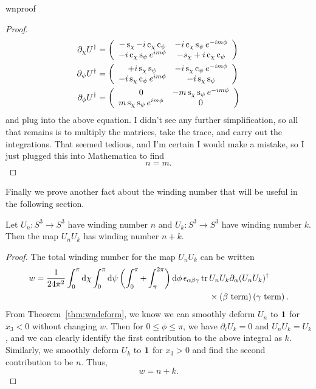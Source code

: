 \begin{proposition}{}{wnproof}
\begin{proof}
\begin{equation*}
\begin{aligned}
    \partial_\chi U^\dagger
             &=\left(\begin{array}{cc}
                  -\operatorname{s}_\chi-i\operatorname{c}_\chi\operatorname{c}_\psi  & -i\operatorname{c}_\chi\operatorname{s}_\psi e^{-im\phi}\\
                 -i\operatorname{c}_\chi\operatorname{s}_\psi e^{im\phi} & -s_\chi+i\operatorname{c}_\chi\operatorname{c}_\psi 
                \end{array}\right)\\
    \partial_\psi U^\dagger
             &=\left(\begin{array}{cc}
                  +i\operatorname{s}_\chi\operatorname{s}_\psi & -i\operatorname{s}_\chi\operatorname{c}_\psi e^{-im\phi}\\
                 -i\operatorname{s}_\chi\operatorname{c}_\psi e^{im\phi} & -i\operatorname{s}_\chi\operatorname{s}_\psi 
                \end{array}\right)\\
    \partial_\phi U^\dagger
             &=\left(\begin{array}{cc}
                  0 & -m\operatorname{s}_\chi\operatorname{s}_\psi e^{-im\phi}\\
                 m\operatorname{s}_\chi\operatorname{s}_\psi e^{im\phi} & 0 
                \end{array}\right)
  \end{aligned}
  \end{equation*}
  and plug into the above equation. I didn't see any further simplification,
  so all that remains is to multiply the matrices, take the trace, and
  carry out the integrations. That seemed tedious, and I'm certain I would
  make a mistake, so I just plugged this into Mathematica to find 
  $$n=m.$$
\end{proof}\end{proposition}

Finally we prove another fact about the winding number that will be useful
in the following section.
\begin{proposition}{}{}
  Let $U_n:S^3\to S^3$ have winding number $n$ and
  $U_k:S^3\to S^3$ have winding number $k$. Then the map
  $U_n U_k$ has winding number $n+k$.
  \begin{proof}
    The total winding number for the map $U_n U_k$ can be written
    \begin{equation*}\begin{aligned}
      w=\frac{1}{24\pi^2}\int_0^\pi\dd{\chi}\int_0^\pi\dd{\psi}
          \left(\int_0^\pi+\int_\pi^{2\pi}\right)\dd{\phi}
          \epsilon_{\alpha\beta\gamma}\tr\,
          &U_nU_k\partial_\alpha(U_nU_k)^\dagger\\
          &\times\left(\text{$\beta$ term}\right)
          \left(\text{$\gamma$ term}\right).
    \end{aligned}\end{equation*}
    From Theorem~\ref{thm:wndeform}, we know we can smoothly
    deform $U_n$ to ${\mathbf 1}$ for $x_3<0$ without changing $w$.
    Then for $0\leq\phi\leq\pi$, we have
    $\partial_i U_k=0$ and $U_n U_k=U_k$, and we can clearly identify
    the first contribution to the above integral as $k$.
    Similarly, we smoothly deform $U_k$ to ${\mathbf 1}$ for
    $x_3>0$ and find the second contribution to be $n$. Thus,
    $$w=n+k.$$
  \end{proof}
\end{proposition}


